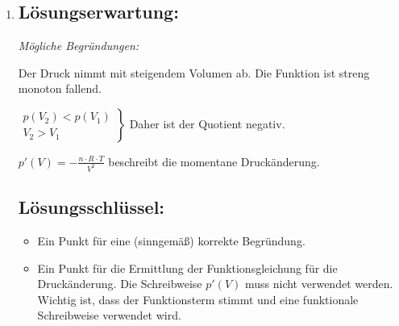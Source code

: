 \begin{langesbeispiel}
{\begin{enumerate}
	\item \subsection{Lösungserwartung:}
		\textit{Mögliche Begründungen:}
	
	Der Druck nimmt mit steigendem Volumen ab. Die Funktion ist streng monoton fallend.\leer
	
$\left.\begin{array}{r}p(V_2)<p(V_1)\\V_2>V_1\end{array}\right\}$ Daher ist der Quotient negativ.\leer

$p'(V)=-\frac{n\cdot R\cdot T}{V^2}$ beschreibt die momentane Druckänderung.

	\subsection{Lösungsschlüssel:}
	
\begin{itemize}
	\item Ein Punkt für eine (sinngemäß) korrekte Begründung.
	\item  Ein Punkt für die Ermittlung der Funktionsgleichung für die Druckänderung. Die Schreibweise $p'(V)$ muss nicht verwendet werden. Wichtig ist, dass der Funktionsterm stimmt und eine funktionale Schreibweise verwendet wird.
\end{itemize}
\end{enumerate}}
		\end{langesbeispiel}